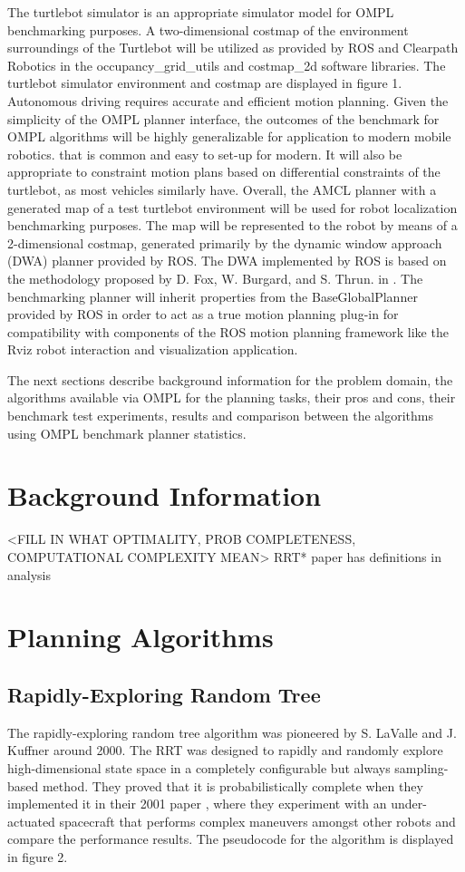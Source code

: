 \documentclass[conference]{IEEEtran} \usepackage[T1]{fontenc} \usepackage[backend=biber, style=ieee]{biblatex}
\begin{document}
The turtlebot simulator is an appropriate simulator model for OMPL benchmarking purposes. A two-dimensional costmap of the environment surroundings of the Turtlebot
will be utilized as provided by ROS and Clearpath Robotics in the occupancy\_grid\_utils and costmap\_2d software libraries. The turtlebot simulator environment and costmap 
are displayed in figure 1. Autonomous driving requires accurate and efficient motion planning. Given the simplicity of the OMPL planner interface, the outcomes of the benchmark
for OMPL algorithms will be highly generalizable for application to modern mobile robotics. that is common and easy to set-up for modern. It will also be appropriate to constraint motion plans based on differential constraints of the turtlebot, as most vehicles similarly have. Overall, the 
AMCL planner with a generated map of a test turtlebot environment will be used for robot localization benchmarking purposes. The map will be represented to the robot by 
means of a 2-dimensional costmap, generated primarily by the dynamic window approach (DWA) planner provided by ROS. The DWA implemented by ROS is based on the 
methodology proposed by D. Fox, W. Burgard, and S. Thrun. in \cite{dwa}. The benchmarking planner will inherit properties from the BaseGlobalPlanner provided by ROS in 
order to act as a true motion planning plug-in for compatibility with components of the ROS motion planning framework like the Rviz robot interaction and visualization 
application.

The next sections describe background information for the problem domain, the algorithms available via OMPL for the planning tasks, their pros and cons, their benchmark 
test experiments, results and comparison between the algorithms using OMPL benchmark planner statistics.

\section{Background Information} \label{Background Information}

<FILL IN WHAT OPTIMALITY, PROB COMPLETENESS, COMPUTATIONAL COMPLEXITY MEAN> RRT* paper has definitions in analysis

\section{Planning Algorithms} \label{Planning Algorithms}

\subsection{Rapidly-Exploring Random Tree} \label{RRT}
The rapidly-exploring random tree algorithm was pioneered by S. LaValle and J. Kuffner around 2000. The RRT was designed to rapidly and randomly explore high-dimensional
state space in a completely configurable but always sampling-based method. They proved that it is probabilistically complete when they implemented it in their 2001 paper 
\cite{random_kinodynamics}, where they experiment with an under-actuated spacecraft that performs complex maneuvers amongst other robots and compare the performance 
results. The pseudocode for the algorithm is displayed in figure 2.
\end{document}
